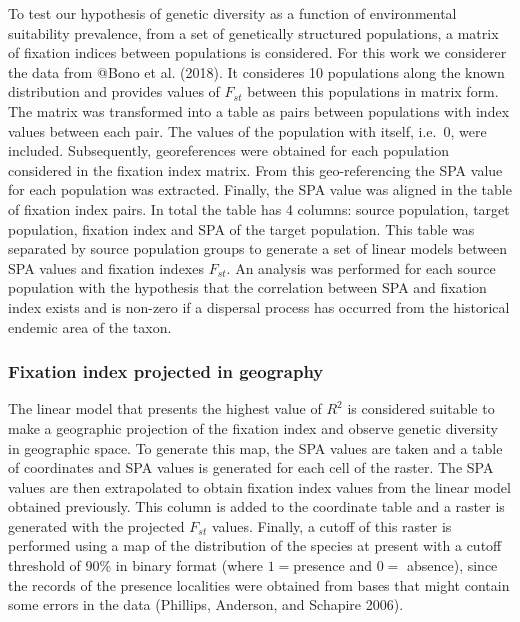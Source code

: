 \documentclass[
]{article}
\begin{document}
To test our hypothesis of genetic diversity as a function of
environmental suitability prevalence, from a set of genetically
structured populations, a matrix of fixation indices between populations
is considered. For this work we considerer the data from @Bono et al.
(2018). It consideres 10 populations along the known distribution and
provides values of \(F_{st}\) between this populations in matrix form.
The matrix was transformed into a table as pairs between populations
with index values between each pair. The values of the population with
itself, i.e.~\(0\), were included. Subsequently, georeferences were
obtained for each population considered in the fixation index matrix.
From this geo-referencing the SPA value for each population was
extracted. Finally, the SPA value was aligned in the table of fixation
index pairs. In total the table has 4 columns: source population, target
population, fixation index and SPA of the target population. This table
was separated by source population groups to generate a set of linear
models between SPA values and fixation indexes \(F_{st}\). An analysis
was performed for each source population with the hypothesis that the
correlation between SPA and fixation index exists and is non-zero if a
dispersal process has occurred from the historical endemic area of the
taxon.

\hypertarget{fixation-index-projected-in-geography}{%
\subsubsection{Fixation index projected in
geography}\label{fixation-index-projected-in-geography}}

The linear model that presents the highest value of \(R^2\) is
considered suitable to make a geographic projection of the fixation
index and observe genetic diversity in geographic space. To generate
this map, the SPA values are taken and a table of coordinates and SPA
values is generated for each cell of the raster. The SPA values are then
extrapolated to obtain fixation index values from the linear model
obtained previously. This column is added to the coordinate table and a
raster is generated with the projected \(F_{st}\) values. Finally, a
cutoff of this raster is performed using a map of the distribution of
the species at present with a cutoff threshold of 90\% in binary format
(where \(1 =\)presence and \(0 =\) absence), since the records of the
presence localities were obtained from bases that might contain some
errors in the data (Phillips, Anderson, and Schapire 2006).
\end{document}
